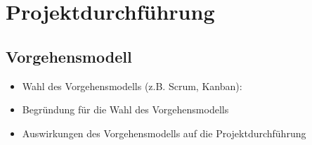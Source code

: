 
\section{Projektdurchführung}\label{projektdurchfuxfchrung}


\subsection{Vorgehensmodell}\label{vorgehensmodell}

\begin{itemize}
  \item
        Wahl des Vorgehensmodells (z.B. Scrum, Kanban):
  \item
        Begründung für die Wahl des Vorgehensmodells
  \item
        Auswirkungen des Vorgehensmodells auf die Projektdurchführung
\end{itemize}

